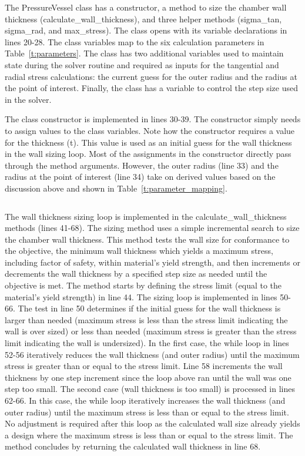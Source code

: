 \documentclass{article}
\begin{document}
The PressureVessel class has a constructor, a method to size the chamber wall thickness (calculate\_wall\_thickness), and three helper methods (sigma\_tan, sigma\_rad, and max\_stress).  The class opens with its variable declarations in lines 20-28.  The class variables map to the six calculation parameters in Table~\ref{t:parameters}.  The class has two additional variables used to maintain state during the solver routine and required as inputs for the tangential and radial stress calculations: the current guess for the outer radius and the radius at the point of interest.  Finally, the class has a variable to control the step size used in the solver.  

The class constructor is implemented in lines 30-39.  The constructor simply needs to assign values to the class variables.  Note how the constructor requires a value for the thickness (t).  This value is used as an initial guess for the wall thickness in the wall sizing loop.  Most of the assignments in the constructor directly pass through the method arguments.  However, the outer radius (line 33) and the radius at the point of interest (line 34) take on derived values based on the discussion above and shown in Table~\ref{t:parameter_mapping}.

\inputminted[breaklines,linenos,frame=lines,framesep=2.0\fboxsep]{python}{pressure_vessel_calcs.py}

The wall thickness sizing loop is implemented in the calculate\_wall\_thickness methods (lines 41-68).  The sizing method uses a simple incremental search to size the chamber wall thickness.  This method tests the wall size for conformance to the objective, the minimum wall thickness which yields a maximum stress, including factor of safety, within material's yield strength, and then increments or decrements the wall thickness by a specified step size as needed until the objective is met.  The method starts by defining the stress limit (equal to the material's yield strength) in line 44.  The sizing loop is implemented in lines 50-66.  The test in line 50 determines if the initial guess for the wall thickness is larger than needed (maximum stress is less than the stress limit indicating the wall is over sized) or less than needed (maximum stress is greater than the stress limit indicating the wall is undersized).  In the first case, the while loop in lines 52-56 iteratively reduces the wall thickness (and outer radius) until the maximum stress is greater than or equal to the stress limit.  Line 58 increments the wall thickness by one step increment since the loop above ran until the wall was one step too small.  The second case (wall thickness is too small) is processed in lines 62-66.  In this case, the while loop iteratively increases the wall thickness (and outer radius) until the maximum stress is less than or equal to the stress limit.  No adjustment is required after this loop as the calculated wall size already yields a design where the maximum stress is less than or equal to the stress limit.  The method concludes by returning the calculated wall thickness in line 68.
\end{document}
